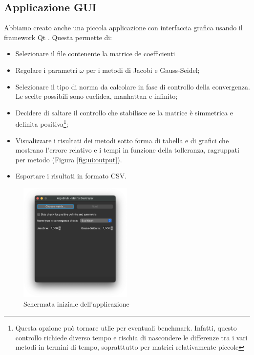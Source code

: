 \subsection{Applicazione GUI}
Abbiamo creato anche una piccola applicazione con interfaccia grafica usando il framework Qt \cite{Qt}. Questa permette di:
\begin{itemize}
	\item Selezionare il file contenente la matrice de coefficienti
	\item Regolare i parametri $\omega$ per i metodi di Jacobi e Gauss-Seidel;
	\item Selezionare il tipo di norma da calcolare in fase di controllo della convergenza. Le scelte possibili sono euclidea, manhattan e infinito;
	\item Decidere di saltare il controllo che stabilisce se la matrice è simmetrica e definita positiva\footnote{Questa opzione può tornare utlie per eventuali benchmark. Infatti, questo controllo richiede diverso tempo e rischia di nascondere le differenze tra i vari metodi in termini di tempo, sopratttutto per matrici relativamente piccole};
	\item Visualizzare i risultati dei metodi sotto forma di tabella e di grafici che mostrano l'errore relativo e i tempi in funzione della tolleranza, ragruppati per metodo (Figura \ref{fig:ui:output}).
	\item Esportare i risultati in formato CSV.
\end{itemize}

\begin{figure}%
	\centering
	\includegraphics[width=0.5\textwidth]{figures/UI/main.png}
	\caption{Schermata iniziale dell'applicazione}%
	\label{fig:ui:main}%
\end{figure}

